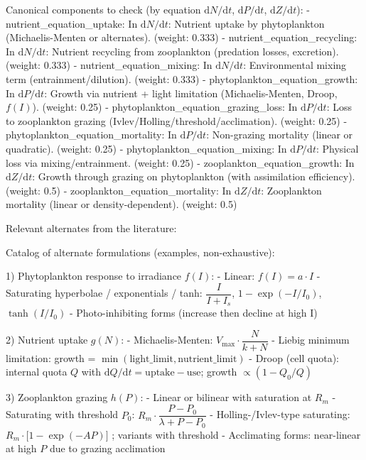 Canonical components to check (by equation \( \mathrm{d}N/\mathrm{d}t \), \( \mathrm{d}P/\mathrm{d}t \), \( \mathrm{d}Z/\mathrm{d}t \)):
- nutrient\_equation\_uptake: In \( \mathrm{d}N/\mathrm{d}t \): Nutrient uptake by phytoplankton (Michaelis-Menten or alternates). (weight: 0.333)
- nutrient\_equation\_recycling: In \( \mathrm{d}N/\mathrm{d}t \): Nutrient recycling from zooplankton (predation losses, excretion). (weight: 0.333)
- nutrient\_equation\_mixing: In \( \mathrm{d}N/\mathrm{d}t \): Environmental mixing term (entrainment/dilution). (weight: 0.333)
- phytoplankton\_equation\_growth: In \( \mathrm{d}P/\mathrm{d}t \): Growth via nutrient + light limitation (Michaelis-Menten, Droop, \( f(I) \)). (weight: 0.25)
- phytoplankton\_equation\_grazing\_loss: In \( \mathrm{d}P/\mathrm{d}t \): Loss to zooplankton grazing (Ivlev/Holling/threshold/acclimation). (weight: 0.25)
- phytoplankton\_equation\_mortality: In \( \mathrm{d}P/\mathrm{d}t \): Non-grazing mortality (linear or quadratic). (weight: 0.25)
- phytoplankton\_equation\_mixing: In \( \mathrm{d}P/\mathrm{d}t \): Physical loss via mixing/entrainment. (weight: 0.25)
- zooplankton\_equation\_growth: In \( \mathrm{d}Z/\mathrm{d}t \): Growth through grazing on phytoplankton (with assimilation efficiency). (weight: 0.5)
- zooplankton\_equation\_mortality: In \( \mathrm{d}Z/\mathrm{d}t \): Zooplankton mortality (linear or density-dependent). (weight: 0.5)

Relevant alternates from the literature:

Catalog of alternate formulations (examples, non-exhaustive):

1) Phytoplankton response to irradiance \( f(I) \):
   - Linear: \( f(I) = a \cdot I \)
   - Saturating hyperbolae / exponentials / tanh:
       \( \dfrac{I}{I + I_s} \),  \( 1 - \exp(-I/I_0) \),  \( \tanh(I/I_0) \)
   - Photo-inhibiting forms (increase then decline at high I)

2) Nutrient uptake \( g(N) \):
   - Michaelis-Menten: \( V_{\max} \cdot \dfrac{N}{k + N} \)
   - Liebig minimum limitation: growth = \( \min(\text{light\_limit}, \text{nutrient\_limit}) \)
   - Droop (cell quota): internal quota \( Q \) with \( \mathrm{d}Q/\mathrm{d}t = \text{uptake} - \text{use} \); growth \( \propto (1 - Q_0/Q) \)

3) Zooplankton grazing \( h(P) \):
   - Linear or bilinear with saturation at \( R_m \)
   - Saturating with threshold \( P_0 \): \( R_m \cdot \dfrac{P - P_0}{\lambda + P - P_0} \)
   - Holling-/Ivlev-type saturating: \( R_m \cdot \bigl[1 - \exp(-A P)\bigr] \) ; variants with threshold
   - Acclimating forms: near-linear at high \( P \) due to grazing acclimation

